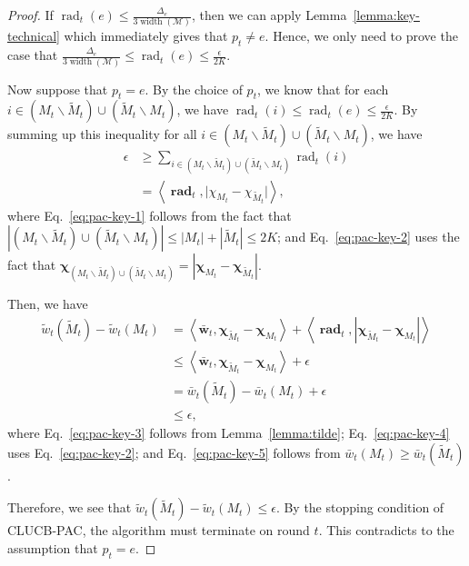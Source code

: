 \documentclass{article}
\newcommand{\AlgorithmPAC}{{\small \textsf{CLUCB-PAC}}\xspace}
\newcommand{\M}{\mathcal M}
\newcommand{\del}{\backslash}
\DeclareMathOperator{\rank}{width}
\DeclareMathOperator{\rad}{rad}
\newcommand{\inn}[1]{\left\langle #1 \right\rangle}
\renewcommand{\vec}[1]{\boldsymbol{#1}}
\begin{document}
\begin{proof}
If $\rad_t(e) \le \frac{\Delta_e}{3\rank(\M)}$, then we can apply Lemma~\ref{lemma:key-technical} which immediately gives that $p_t\not= e$.
Hence, we only need to prove the case that $\frac{\Delta_e}{3\rank(\M)} \le \rad_t(e) \le \frac{\epsilon}{2K}$.

Now suppose that $p_t = e$.
By the choice of $p_t$, we know that for each $i\in (M_t\del \tilde M_t) \cup (\tilde M_t \del M_t)$, we have
$\rad_t(i) \le \rad_t(e) \le \frac{\epsilon}{2K}$.
By summing up this inequality for all $i \in (M_t\del \tilde M_t) \cup (\tilde M_t \del M_t)$, we have
\begin{align}
\epsilon &\ge \sum_{i\in (M_t\del \tilde M_t) \cup (\tilde M_t \del M_t)} \rad_t(i)\label{eq:pac-key-1} \\
		     &= \inn{\vec \rad_t, \big|\chi_{M_t}-\chi_{\tilde M_t}\big|}, \label{eq:pac-key-2}
\end{align}
where Eq.~\eqref{eq:pac-key-1} follows from the fact that
$|(M_t\del \tilde M_t) \cup (\tilde M_t \del M_t)| \le |M_t|+|\tilde M_t| \le 2K$;
and Eq.~\eqref{eq:pac-key-2} uses the fact that
$\vec \chi_{(M_t\del \tilde M_t) \cup (\tilde M_t \del M_t)} = |\vec \chi_{M_t}-\vec \chi_{\tilde M_t}|$.

Then, we have
\begin{align}
\tilde w_t(\tilde M_t) - \tilde w_t(M_t) 
&= \inn{\vec {\bar w}_t, \vec \chi_{\tilde M_t}-\vec\chi_{M_t}}+\inn{\vec \rad_t, |\vec \chi_{\tilde M_t}-\vec\chi_{M_t}|}
\label{eq:pac-key-3}\\
&\le \inn{\vec {\bar w}_t, \vec \chi_{\tilde M_t}-\vec\chi_{M_t}}+\epsilon 
\label{eq:pac-key-4}\\
&= \bar w_t(\tilde M_t)-\bar w_t(M_t)+\epsilon \nonumber\\
&\le \epsilon, \label{eq:pac-key-5}
\end{align}
where Eq.~\eqref{eq:pac-key-3} follows from Lemma~\ref{lemma:tilde};
Eq.~\eqref{eq:pac-key-4} uses Eq.~\eqref{eq:pac-key-2};
and Eq.~\eqref{eq:pac-key-5} follows from $\bar w_t(M_t)\ge \bar w_t(\tilde M_t)$.


Therefore, we see that $\tilde w_t(\tilde M_t)-\tilde w_t(M_t) \le \epsilon$.
By the stopping condition of \AlgorithmPAC, the algorithm must terminate on round $t$. 
This contradicts to the assumption that $p_t = e$.
\end{proof}
\end{document}
